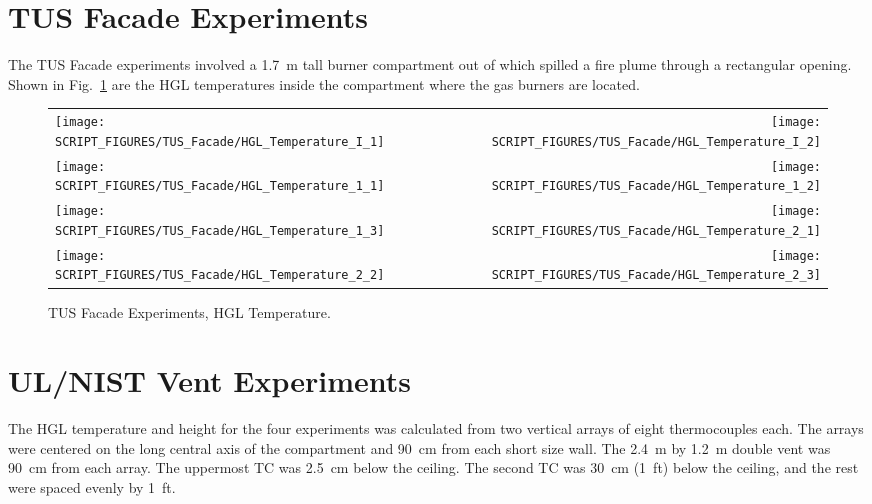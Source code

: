 \section{TUS Facade Experiments}

The TUS Facade experiments involved a 1.7~m tall burner compartment out of which spilled a fire plume through a rectangular opening. Shown in Fig.~\ref{TUS_Facade_HGL_Temp} are the HGL temperatures inside the compartment where the gas burners are located.

\newpage

\begin{figure}[p]
\begin{tabular*}{\textwidth}{l@{\extracolsep{\fill}}r}
\texttt{[image: SCRIPT\_FIGURES/TUS\_Facade/HGL\_Temperature\_I\_1]} &
\texttt{[image: SCRIPT\_FIGURES/TUS\_Facade/HGL\_Temperature\_I\_2]} \\
\texttt{[image: SCRIPT\_FIGURES/TUS\_Facade/HGL\_Temperature\_1\_1]} &
\texttt{[image: SCRIPT\_FIGURES/TUS\_Facade/HGL\_Temperature\_1\_2]} \\
\texttt{[image: SCRIPT\_FIGURES/TUS\_Facade/HGL\_Temperature\_1\_3]} &
\texttt{[image: SCRIPT\_FIGURES/TUS\_Facade/HGL\_Temperature\_2\_1]} \\
\texttt{[image: SCRIPT\_FIGURES/TUS\_Facade/HGL\_Temperature\_2\_2]} &
\texttt{[image: SCRIPT\_FIGURES/TUS\_Facade/HGL\_Temperature\_2\_3]}
\end{tabular*}
\caption[TUS Facade Experiments, HGL Temperature]
{TUS Facade Experiments, HGL Temperature.}
\label{TUS_Facade_HGL_Temp}
\end{figure}


\clearpage


\section{UL/NIST Vent Experiments}

The HGL temperature and height for the four experiments was calculated from two vertical arrays of eight thermocouples each. The arrays were centered on the long central axis of the compartment and 90~cm from each short size wall. The 2.4~m by 1.2~m double vent was 90~cm from each array. The uppermost TC was 2.5~cm below the ceiling. The second TC was 30~cm (1~ft) below the ceiling, and the rest were spaced evenly by 1~ft.

\newpage

